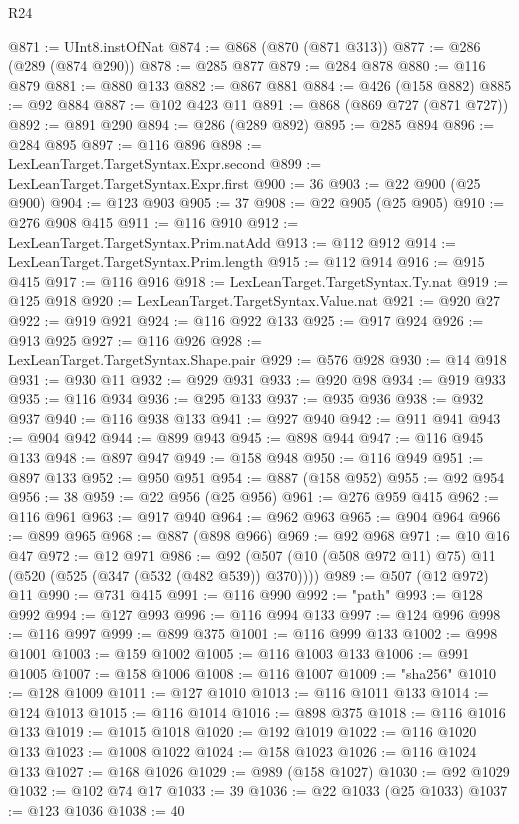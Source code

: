 \begin{lexlean}{R24}
\begin{coremodule}
{{{{{{{{{{{{{{{{{{{{{{{{{{{{{{{{{{{{{{{{{{{{{{{{{{{{{{{{{{{{{{{{{{{{{{{{{{{{{{{{{{{{{{{{{{{{{{{{{{{{{{{{{{{{{{{{{{{{{{{{{{{{{{{{{{{{{{{{{{{{{{{{{{{{{{{{{{{{{{{{{{{{{{{{{{{{{{{{{{{{{{{{{{{{{{{{{{{@871 := UInt8.instOfNat
@874 := @868 (@870 (@871 @313))
@877 := @286 (@289 (@874 @290))
@878 := @285 @877
@879 := @284 @878
@880 := @116 @879
@881 := @880 @133
@882 := @867 @881
@884 := @426 (@158 @882)
@885 := @92 @884
@887 := @102 @423 @11
@891 := @868 (@869 @727 (@871 @727))
@892 := @891 @290
@894 := @286 (@289 @892)
@895 := @285 @894
@896 := @284 @895
@897 := @116 @896
@898 := LexLeanTarget.TargetSyntax.Expr.second
@899 := LexLeanTarget.TargetSyntax.Expr.first
@900 := 36
@903 := @22 @900 (@25 @900)
@904 := @123 @903
@905 := 37
@908 := @22 @905 (@25 @905)
@910 := @276 @908 @415
@911 := @116 @910
@912 := LexLeanTarget.TargetSyntax.Prim.natAdd
@913 := @112 @912
@914 := LexLeanTarget.TargetSyntax.Prim.length
@915 := @112 @914
@916 := @915 @415
@917 := @116 @916
@918 := LexLeanTarget.TargetSyntax.Ty.nat
@919 := @125 @918
@920 := LexLeanTarget.TargetSyntax.Value.nat
@921 := @920 @27
@922 := @919 @921
@924 := @116 @922 @133
@925 := @917 @924
@926 := @913 @925
@927 := @116 @926
@928 := LexLeanTarget.TargetSyntax.Shape.pair
@929 := @576 @928
@930 := @14 @918
@931 := @930 @11
@932 := @929 @931
@933 := @920 @98
@934 := @919 @933
@935 := @116 @934
@936 := @295 @133
@937 := @935 @936
@938 := @932 @937
@940 := @116 @938 @133
@941 := @927 @940
@942 := @911 @941
@943 := @904 @942
@944 := @899 @943
@945 := @898 @944
@947 := @116 @945 @133
@948 := @897 @947
@949 := @158 @948
@950 := @116 @949
@951 := @897 @133
@952 := @950 @951
@954 := @887 (@158 @952)
@955 := @92 @954
@956 := 38
@959 := @22 @956 (@25 @956)
@961 := @276 @959 @415
@962 := @116 @961
@963 := @917 @940
@964 := @962 @963
@965 := @904 @964
@966 := @899 @965
@968 := @887 (@898 @966)
@969 := @92 @968
@971 := @10 @16 @47
@972 := @12 @971
@986 := @92 (@507 (@10 (@508 @972 @11) @75) @11 (@520 (@525 (@347 (@532 (@482 @539)) @370))))
@989 := @507 (@12 @972) @11
@990 := @731 @415
@991 := @116 @990
@992 := "path"
@993 := @128 @992
@994 := @127 @993
@996 := @116 @994 @133
@997 := @124 @996
@998 := @116 @997
@999 := @899 @375
@1001 := @116 @999 @133
@1002 := @998 @1001
@1003 := @159 @1002
@1005 := @116 @1003 @133
@1006 := @991 @1005
@1007 := @158 @1006
@1008 := @116 @1007
@1009 := "sha256"
@1010 := @128 @1009
@1011 := @127 @1010
@1013 := @116 @1011 @133
@1014 := @124 @1013
@1015 := @116 @1014
@1016 := @898 @375
@1018 := @116 @1016 @133
@1019 := @1015 @1018
@1020 := @192 @1019
@1022 := @116 @1020 @133
@1023 := @1008 @1022
@1024 := @158 @1023
@1026 := @116 @1024 @133
@1027 := @168 @1026
@1029 := @989 (@158 @1027)
@1030 := @92 @1029
@1032 := @102 @74 @17
@1033 := 39
@1036 := @22 @1033 (@25 @1033)
@1037 := @123 @1036
@1038 := 40
}}}}}}}}}}}}}}}}}}}}}}}}}}}}}}}}}}}}}}}}}}}}}}}}}}}}}}}}}}}}}}}}}}}}}}}}}}}}}}}}}}}}}}}}}}}}}}}}}}}}}}}}}}}}}}}}}}}}}}}}}}}}}}}}}}}}}}}}}}}}}}}}}}}}}}}}}}}}}}}}}}}}}}}}}}}}}}}}}}}}}}}}}}}}}}}}}}}
\end{coremodule}
\end{lexlean}
